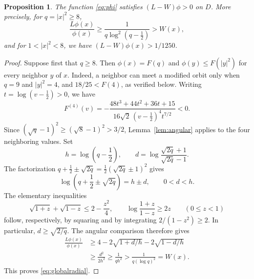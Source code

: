 \documentclass[11pt]{amsart}
\newtheorem{proposition}[theorem]{Proposition}
\numberwithin{equation}{section}
\begin{document}
\begin{proposition}\label{prop:super}
The function \eqref{eq:phi} satisfies $(L-W)\phi>0$ on $D$.
More precisely, for $q=|x|^2\ge8$,
\begin{equation}\label{eq:globalradial}
\frac{L\phi(x)}{\phi(x)}\ge\frac1{q\log^2(q-\frac12)}>W(x),
\end{equation}
and for $1<|x|^2<8$, we have $(L-W)\phi(x)>1/1250$.
\end{proposition}

\begin{proof}
Suppose first that $q\ge8$. Then $\phi(x)=F(q)$ and
$\phi(y)\le F(|y|^2)$ for every neighbor $y$ of $x$.
Indeed, a neighbor can meet a modified orbit only when $q=9$ and
$|y|^2=4$, and $18/25<F(4)$, as verified below.
Writing $t=\log(v-\frac12)>0$, we have
\[
F^{(4)}(v)=
-\frac{48t^3+44t^2+36t+15}
{16\sqrt2\,(v-\frac12)^4t^{7/2}}<0.
\]
Since $(\sqrt q-1)^2\ge(\sqrt8-1)^2>3/2$,
Lemma~\ref{lem:angular} applies to the four neighboring values.
Set
\[
h=\log\left(q-\frac12\right),\qquad
d=\log\frac{\sqrt{2q}+1}{\sqrt{2q}-1}.
\]
The factorization
$q+\frac12\pm\sqrt{2q}=\frac12(\sqrt{2q}\pm1)^2$
gives
\[
\log\left(q+\frac12\pm\sqrt{2q}\right)=h\pm d,
\qquad 0<d<h.
\]
The elementary inequalities
\[
\sqrt{1+z}+\sqrt{1-z}\le2-\frac{z^2}{4},
\qquad
\log\frac{1+z}{1-z}\ge2z
\qquad(0\le z<1)
\]
follow, respectively, by squaring and by integrating
$2/(1-z^2)\ge2$. In particular, $d\ge\sqrt{2/q}$.
The angular comparison therefore gives
\begin{align*}
\frac{L\phi(x)}{\phi(x)}
&\ge4-2\sqrt{1+d/h}-2\sqrt{1-d/h}\\
&\ge\frac{d^2}{2h^2}
\ge\frac1{qh^2}>\frac1{q(\log q)^2}=W(x).
\end{align*}
This proves \eqref{eq:globalradial}.


\end{proof}
\end{document}
